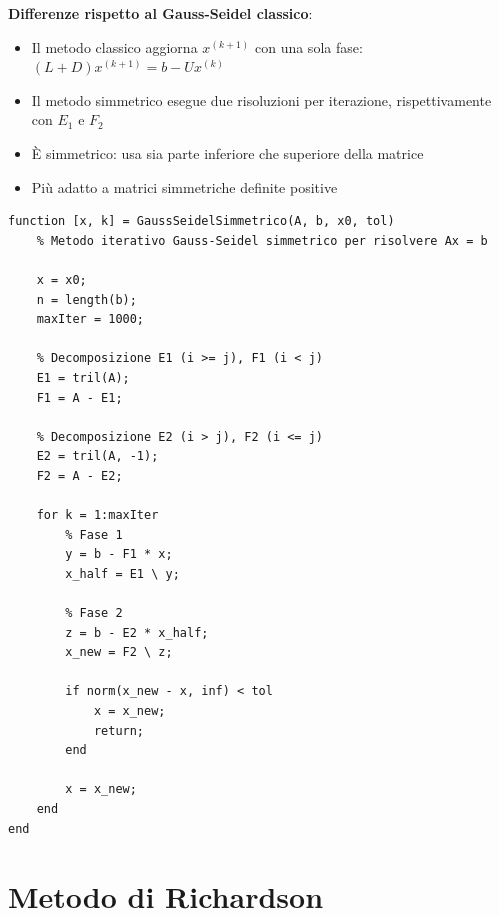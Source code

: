 \documentclass[12pt,a4paper]{article}
\begin{document}
\vspace{0.6em}

\textbf{Differenze rispetto al Gauss-Seidel classico}:
\begin{itemize}
    \item Il metodo classico aggiorna $x^{(k+1)}$ con una sola fase: $(L + D)x^{(k+1)} = b - Ux^{(k)}$
    \item Il metodo simmetrico esegue due risoluzioni per iterazione, rispettivamente con $E_1$ e $F_2$
    \item È simmetrico: usa sia parte inferiore che superiore della matrice
    \item Più adatto a matrici simmetriche definite positive
\end{itemize}

\newpage
\vspace{1em}
\begin{lstlisting}
function [x, k] = GaussSeidelSimmetrico(A, b, x0, tol)
    % Metodo iterativo Gauss-Seidel simmetrico per risolvere Ax = b

    x = x0;
    n = length(b);
    maxIter = 1000;

    % Decomposizione E1 (i >= j), F1 (i < j)
    E1 = tril(A);
    F1 = A - E1;

    % Decomposizione E2 (i > j), F2 (i <= j)
    E2 = tril(A, -1);
    F2 = A - E2;

    for k = 1:maxIter
        % Fase 1
        y = b - F1 * x;
        x_half = E1 \ y;

        % Fase 2
        z = b - E2 * x_half;
        x_new = F2 \ z;

        if norm(x_new - x, inf) < tol
            x = x_new;
            return;
        end

        x = x_new;
    end
end
\end{lstlisting}

\newpage
\section*{Metodo di Richardson}

\begin{flushleft}
\end{flushleft}
\end{document}
